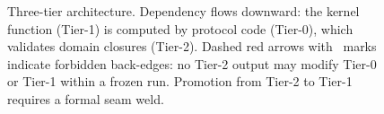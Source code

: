 \documentclass[
  aps,
  prd,
  twocolumn,
  superscriptaddress,
  nofootinbib,
  floatfix
]{revtex4-2}
\begin{document}
\begin{figure}[t!]
\caption{Three-tier architecture.  Dependency flows
downward: the kernel function (Tier-1) is computed by
protocol code (Tier-0), which validates domain closures
(Tier-2).  Dashed red arrows with \texttimes\ marks
indicate forbidden back-edges: no Tier-2 output may modify
Tier-0 or Tier-1 within a frozen run.  Promotion from
Tier-2 to Tier-1 requires a formal seam weld.}
\label{fig:tiers}
\end{figure}

\end{document}
